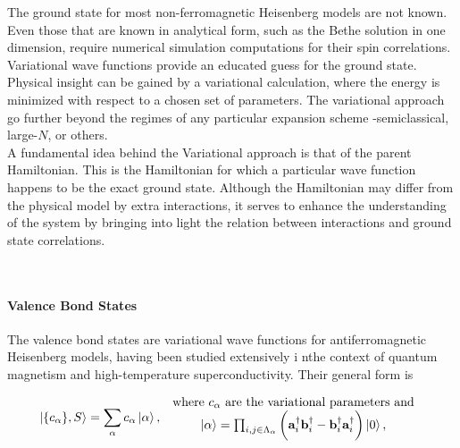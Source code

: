 \documentclass{homework}
\begin{document}
\begin{tcolorbox}[colback =yellow, title = Physical Context]

The ground state for most non-ferromagnetic Heisenberg models are not known. Even those that are known in analytical form, such as the Bethe solution in one dimension, require numerical simulation computations for their spin correlations. Variational wave functions provide an educated guess for the ground state. Physical insight can be gained by a variational calculation, where the energy is minimized with respect to a chosen set of parameters. The variational approach go further beyond the regimes of any particular expansion scheme -semiclassical, large-$N$, or others. \\

A fundamental idea behind the Variational approach is that of the parent Hamiltonian. This is the Hamiltonian for which a particular wave function happens to be the exact ground state. Although the Hamiltonian may differ from the physical model by extra interactions, it serves to enhance the understanding of the system by bringing into light the relation between interactions and ground state correlations. \\

\end{tcolorbox}

\blanky \\

\paragraph{\textbf{Valence Bond States}}

The valence bond states are variational wave functions for antiferromagnetic Heisenberg models, having been studied extensively i nthe context of quantum magnetism and high-temperature superconductivity. Their general form is 

\begin{equation}
    \ket{\{c_{\alpha}\}, S} = \sum_{\alpha} c_{\alpha} \ket{\alpha}, \begin{array}{c}
         \textnormal{ where $c_{\alpha}$ are the variational parameters and }  \\
         \ket{\alpha} = \prod_{i,j \in \Lambda_{\alpha}} \bigg({\bf a}_i^\dagger {\bf b}_i^\dagger - {\bf b}_i^\dagger {\bf a}_i^\dagger \bigg) \ket{0},
    \end{array}
    \label{Valence_bond_states}
\end{equation}
\end{document}
